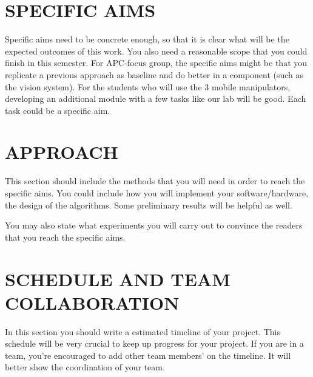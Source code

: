 \documentclass[letterpaper, 10 pt, conference]{ieeeconf}  %
\begin{document}
\section{SPECIFIC AIMS}

Specific aims need to be concrete enough, so that it is clear what will be the expected outcomes of this work. You also need a reasonable scope that you could finish in this semester. For APC-focus group, the specific aims might be that you replicate a previous approach as baseline and do better in a component (such as the vision system). For the students who will use the 3 mobile manipulators, developing an additional module with a few tasks like our lab will be good. Each task could be a specific aim.

\section{APPROACH}

This section should include the methods that you will need in order to reach the specific aims. You could include how you will implement your software/hardware, the design of the algorithms. Some preliminary results will be helpful as well. 

You may also state what experiments you will carry out to convince the readers that you reach the specific aims.

\section{SCHEDULE AND TEAM COLLABORATION}

In this section you should write a estimated timeline of your project. This schedule will be very crucial to keep up progress for your project. If you are in a team, you're encouraged to add other team members' on the timeline. It will better show the coordination of your team.
   



\end{document}
